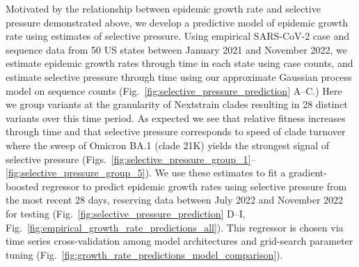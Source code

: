 \documentclass[11pt,oneside,letterpaper]{article}
\begin{document}
Motivated by the relationship between epidemic growth rate and selective pressure demonstrated above, we develop a predictive model of epidemic growth rate using estimates of selective pressure.
Using empirical SARS-CoV-2 case and sequence data from 50 US states between January 2021 and November 2022, we estimate epidemic growth rates through time in each state using case counts, and estimate selective pressure through time using our approximate Gaussian process model on sequence counts  (Fig.~\ref{fig:selective_pressure_prediction} A--C.)
Here we group variants at the granularity of Nextstrain clades \cite{aksamentov2021nextclade} resulting in 28 distinct variants over this time period.
As expected we see that relative fitness increases through time and that selective pressure corresponds to speed of clade turnover where the sweep of Omicron BA.1 (clade 21K) yields the strongest signal of selective pressure (Figs.~\ref{fig:selective_pressure_group_1}--\ref{fig:selective_pressure_group_5}).
We use these estimates to fit a gradient-boosted regressor to predict epidemic growth rates using selective pressure from the most recent 28 days, reserving data between July 2022 and November 2022 for testing (Fig.~\ref{fig:selective_pressure_prediction} D--I, Fig.~\ref{fig:empirical_growth_rate_predictions_all}).
This regressor is chosen via time series cross-validation among model architectures and grid-search parameter tuning (Fig.~\ref{fig:growth_rate_predictions_model_comparison}).
\end{document}
